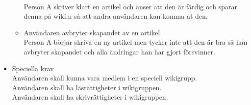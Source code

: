 \begin{itemize}
\begin{itemize}
		\\Person A skriver klart en artikel och anser att den är färdig och sparar denna på wiki:n så att andra användaren kan komma åt den.
		\item Användaren avbryter skapandet av en artikel
		\\Person A börjar skriva en ny artikel men tycker inte att den är bra så han avbryter skapandet och alla ändringar han har gjort försvinner.
	\end{itemize}	
	\item Speciella krav
	\\Användaren skall kunna vara medlem i en speciell wikigrupp.
	\\Användaren skall ha läsrättigheter i wikigruppen.
	\\Användaren skall ha skrivrättigheter i wikigruppen.
\end{itemize}

